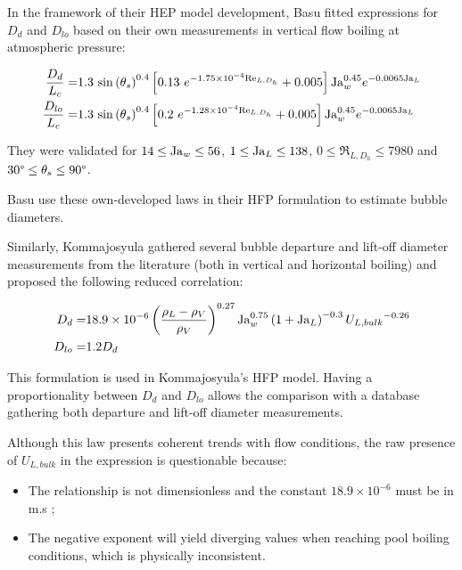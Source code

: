 \npar

In the framework of their HEP model development, Basu \etal fitted expressions for $D_{d}$ and $D_{lo}$ based on their own measurements in vertical flow boiling at atmospheric pressure:

\begin{align}
\frac{D_{d}}{L_{c}} =& 1.3~\sin{\theta_{s}}^{0.4}\crocht{ 0.13\ e^{-1.75\times 10^{-4} \Re_{L,D_{h}}}+0.005 }\Ja_{w}^{0.45}e^{-0.0065\Ja_{L}}
\label{eq:dd_basu}\\
%
\frac{D_{lo}}{L_{c}} =& 1.3~ \sin{\theta_{s}}^{0.4}\crocht{ 0.2\ e^{-1.28\times 10^{-4} \Re_{L,D_{h}}}+0.005 }\Ja_{w}^{0.45}e^{-0.0065\Ja_{L}}
\label{eq:dlo_basu}
\end{align}

They were validated for $14 \leq \mathrm{Ja}_{w} \leq 56$, $1 \leq \mathrm{Ja}_{L} \leq 138$, $0\leq \Re_{L,D_{h}} \leq 7980$ and $30\degree \leq \theta_{s} \leq 90 \degree$.


\begin{note*}{}
Basu \etal use these own-developed laws in their HFP formulation to estimate bubble diameters.
\end{note*}

\npar

Similarly, Kommajosyula\cite{kommajosyula_development_2020} gathered several bubble departure and lift-off diameter measurements from the literature (both in vertical and horizontal boiling) and proposed the following reduced correlation:

\begin{align}
D_{d} =& 18.9 \times 10^{-6} \left( \frac{\rho_{L}-\rho_{V}}{\rho_{V}} \right)^{0.27} \mathrm{Ja}_{w}^{0.75} \left( 1+\mathrm{Ja}_{L} \right)^{-0.3} {U_{L,bulk}}^{-0.26}
\label{eq:dd_komma} \\
D_{lo} =& 1.2 D_{d}
\label{eq:dlo_komma}
\end{align}

\begin{note*}{}
This formulation is used in Kommajosyula's HFP model. Having a proportionality between $D_{d}$ and $D_{lo}$ allows the comparison with a database gathering both departure and lift-off diameter measurements.
\end{note*}

Although this law presents coherent trends with flow conditions, the raw presence of $U_{L,bulk}$ in the expression is questionable because:

\begin{itemize}
\item The relationship is not dimensionless and the constant $18.9 \times 10^{-6}$ must be in m.s ;
\item The negative exponent will yield diverging values when reaching pool boiling conditions, which is physically inconsistent.
\end{itemize}



